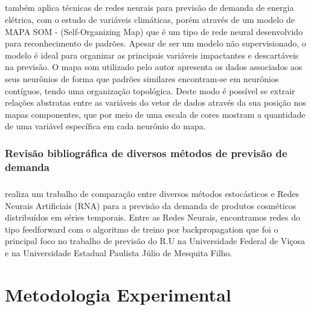 \documentclass[	12pt, Times, openright, twoside, a4paper, english, brazil]{abntex2}
\begin{document}
        \paragraph*{} \cite{Silva2010} também aplica técnicas de redes neurais para previsão de demanda de energia elétrica, com o estudo de variáveis climáticas, porém através de um modelo de MAPA SOM - (Self-Organizing Map) que é um tipo de rede neural desenvolvido para reconhecimento de padrões. Apesar de ser um modelo não supervisionado, o modelo é ideal para organizar as principais variáveis impactantes e descartáveis na previsão. O mapa som utilizado pelo autor apresenta os dados associados aos seus neurônios de forma que padrões similares encontram-se em neurônios contíguos, tendo uma organização topológica. Deste modo é possível se extrair relações abstratas entre as variáveis do vetor de dados através da sua posição nos mapas componentes, que por meio de uma escala de cores mostram a quantidade de uma variável específica em cada neurônio do mapa.
       
       \subsection{Revisão bibliográfica de diversos métodos de previsão de demanda}
        \paragraph*{} \cite{Junior2007} realiza um trabalho de comparação entre diversos métodos estocásticos e  Redes Neurais Artificiais (RNA) para a previsão da demanda de produtos cosméticos distribuídos em séries temporais. Entre as Redes Neurais, encontramos redes do tipo feedforward com o algoritmo de treino por backpropagation que foi o principal foco no trabalho de previsão do R.U na Universidade Federal de Viçosa e na Universidade Estadual Paulista Júlio de Mesquita Filho.
        
  \chapter{Metodologia Experimental}
\end{document}

